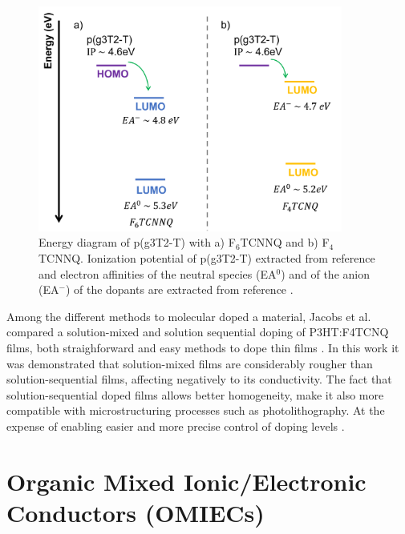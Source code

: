\begin{figure}
  \centering
  \includegraphics[width=10cm]{Images/dopingprocess.png}
  \caption{Energy diagram of p(g3T2-T) with a) F$_{6}$TCNNQ and b) F$_{4}$TCNNQ. Ionization potential of p(g3T2-T) extracted from reference \cite{tanTuningOrganicElectrochemical2022} and electron affinities of the neutral species (EA$^{0}$) and of the anion (EA$^{-}$) of the dopants are extracted from reference \cite{kieferDoubleDopingConjugated2019}.}
  \label{fig:doping}
\end{figure}

Among the different methods to molecular doped a material, Jacobs et al. compared a solution-mixed and solution sequential doping of P3HT:F4TCNQ films, both straighforward and easy methods to dope thin films \cite{jacobsComparisonSolutionmixedSequentially2016}. In this work it was demonstrated that solution-mixed films are considerably rougher than solution-sequential films, affecting negatively to its conductivity. The fact that solution-sequential doped films allows better homogeneity, make it also more compatible with microstructuring processes such as photolithography. At the expense of enabling easier and more precise control of doping levels \cite{tanOrganicMixedIonic2022}.




\section{Organic Mixed Ionic/Electronic Conductors (OMIECs)}

